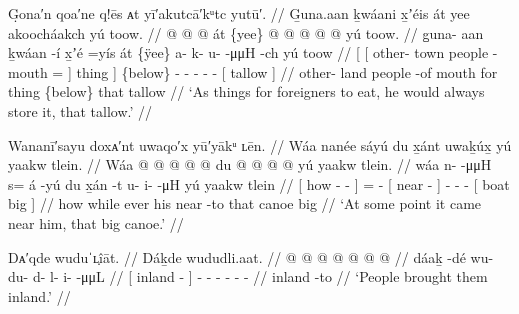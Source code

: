 \ex\label{ex:92-5-put-away-tallow}%
%
\begingl
	\glpreamble	G̣ona′n qoa′ne q!ēs ᴀt yī′akutcā′kᵘtc yutū′. //
	\glpreamble	G̱una.aan ḵwáani x̱ʼéis át yee akoocháakch yú toow. //
	\gla	{} {}  @ {}  @ {}  @ {} {}
			át {} \{yee\} {}
		 @ {} @ {} @ {} @ {} @ {}
		{} yú toow. {} //
	\glb	{} {} g̱una- aan ḵwáan -í x̱ʼé =yís {} 
			át {} \{ÿee\} {}
		a- k- u-  -μμH -ch
		{} yú toow {} //
	\glc	{}[ {}[ other- town people - mouth = {}]
			thing {}] \{below\} {}
		- - -  - -
		{}[  tallow {}] //
	\gld	{} {} other- land people -of mouth \•for {} thing {} \{below\} {}
		 {} {} {} {} {}
		{} that tallow {} //
	\glft	‘As things for foreigners to eat, he would always store it, that tallow.’
		//
\endgl
\xe


\ex\label{ex:92-6-big-canoe-came-near}%
%
\begingl
	\glpreamble	Wananī′sayu doxᴀ′nt uwaqo′x yū′yākᵘ ʟēn. //
	\glpreamble	Wáa nanée sáyú du x̱ánt uwaḵúx̱ yú yaakw tlein. //
	\gla	{} Wáa  @ {} @ {} @ {} {}
		 @ {} @ {}
		{} du  @ {} {}
		 @ {} @ {} @ {}
		{} yú yaakw tlein. {} //
	\glb	{} wáa n-  -μμH {} {} 
		s= á -yú
		{} du x̱án -t {}
		u- i-  -μH
		{} yú yaakw tlein {} //
	\glc	{}[ how -  - \· {}]
		=  -
		{}[  near - {}]
		- -  -
		{}[  boat big {}] //
	\gld	{} how  {} {} \·while {}
		ever\·  {}
		{} his near -to {}
		 {} {} {}
		{} that canoe big {} //
	\glft	‘At some point it came near him, that big canoe.’
		//
\endgl
\xe

\ex\label{ex:92-7-ppl-brought-them-inland}%
%
\begingl
	\glpreamble	Dᴀ′qde wuduˈʟ̣îāt. //
	\glpreamble	Dáḵde wududli.aat. //
	\gla	{}  @ {} {}  @ {} @ {} @ {} @ {} @ {} @ {} //
	\glb	{} dáaḵ -dé {} wu- du- d- l- i-  -μμL //
	\glc	{}[ inland - {}]
		- - - - -
			 - //
	\gld	{} inland -to {}  {} {} {} {} {} {} //
	\glft	‘People brought them inland.’
		//
\endgl
\xe

